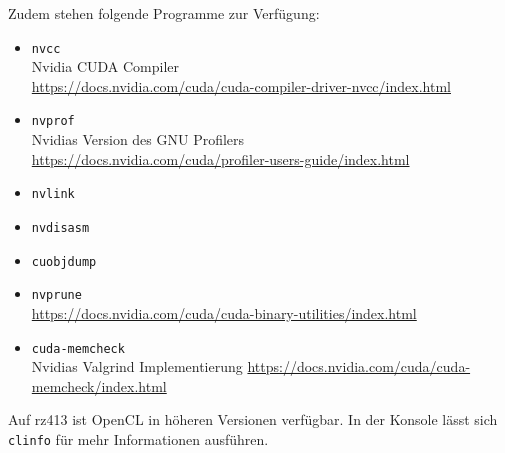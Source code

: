 \documentclass[headsepline=3pt,headinclude=true,12pt,oneside]{scrartcl}
\let\li=\lstinline
\begin{document}
	Zudem stehen folgende Programme zur Verfügung:
	\begin{itemize}
		\item \li`nvcc` \\
		Nvidia CUDA Compiler \\
		\url{https://docs.nvidia.com/cuda/cuda-compiler-driver-nvcc/index.html}
		
		\item \li`nvprof` \\
		Nvidias Version des GNU Profilers \\
		\url{https://docs.nvidia.com/cuda/profiler-users-guide/index.html}	
		\item \li`nvlink`	  
		\item \li`nvdisasm`
		\item \li`cuobjdump` 
		\item \li`nvprune` \\
		\url{https://docs.nvidia.com/cuda/cuda-binary-utilities/index.html}
		\item \li`cuda-memcheck` \\
		Nvidias Valgrind Implementierung
		\url{https://docs.nvidia.com/cuda/cuda-memcheck/index.html}
	\end{itemize}
	
	Auf rz413 ist OpenCL in höheren Versionen verfügbar. In der Konsole lässt sich \li`clinfo` für mehr Informationen ausführen. 
		
\end{document}
